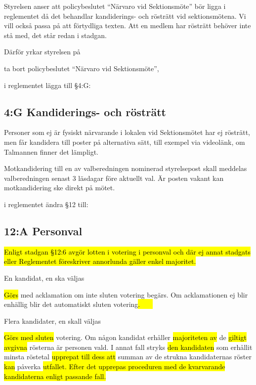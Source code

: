\documentclass[../_main/handlingar.tex]{subfiles}
\begin{document}

Styrelsen anser att policybeslutet ``Närvaro vid Sektionsmöte'' bör ligga i reglementet då det behandlar kandiderings- och rösträtt vid sektionsmötena. Vi vill också passa på att förtydliga texten. Att en medlem har rösträtt behöver inte stå med, det står redan i stadgan.

Därför yrkar styrelsen på

\begin{attsatser}
    \att ta bort policybeslutet ``Närvaro vid Sektionsmöte'',

    \att i reglementet lägga till \S4:G:\par
        \subsection*{4:G Kandiderings- och rösträtt}
        Personer som ej är fysiskt närvarande i lokalen vid Sektionsmötet har ej rösträtt, men får kandidera till poster på alternativa sätt, till exempel via videolänk, om Talmannen finner det lämpligt.

        Motkandidering till en av valberedningen nominerad styrelsepost skall meddelas valberedningen senast 3 läsdagar före aktuellt val. Är posten vakant kan motkandidering ske direkt på mötet.

    \newpage

    \att i reglementet ändra \S12 till:\par

        \subsection{12:A Personval}

        \hl{Enligt stadgan \S12:6 avgör lotten i votering i personval och där ej annat stadgats eller Reglementet föreskriver annorlunda gäller enkel majoritet.}

        \begin{alphlist}
        \item En kandidat, en ska väljas\par
        \hl{Görs} med acklamation om inte sluten votering begärs. Om acklamationen ej blir enhällig blir det automatiskt sluten votering\hl{. \ \ \ }

        \item Flera kandidater, en skall väljas\par
        \hl{Görs med sluten} votering. Om någon kandidat erhåller \hl{majoriteten av} de \hl{giltigt avgivna} rösterna är personen vald. I annat fall stryks \hl{den kandidaten} som erhållit minsta röstetal\hl{ upprepat till dess att} summan av de strukna kandidaternas röster \hl{kan} påverka \hl{utfallet. Efter det upprepas proceduren med de kvarvarande kandidaterna enligt passande fall.}


\end{alphlist}
\end{attsatser}
\end{document}
